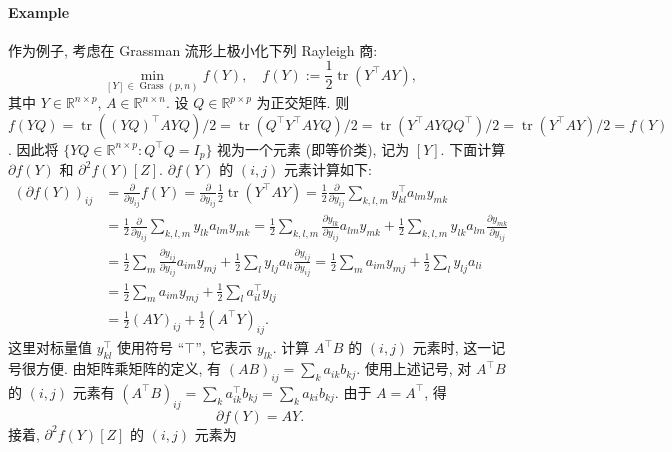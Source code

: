 \paragraph{Example}\label{ex:grassmann-rayleigh}
{作为例子, 考虑在 Grassman 流形上极小化下列 Rayleigh 商:}
\[\min_{[Y]\in\operatorname{Grass}(p,n)}f(Y),\quad f(Y):=\frac12\operatorname{tr}(Y^{\top}AY),\]
{其中 $Y\in\mathbb{R}^{n\times p}$, $A\in\mathbb{R}^{n\times n}$. 设 $Q\in\mathbb{R}^{p\times p}$ 为正交矩阵. 则 $f(YQ)=\operatorname{tr}((YQ)^{\top}AYQ)/2=\operatorname{tr}(Q^{\top}Y^{\top}AYQ)/2=\operatorname{tr}(Y^{\top}AYQQ^{\top})/2=\operatorname{tr}(Y^{\top}AY)/2=f(Y)$. 因此将 $\{YQ\in\mathbb{R}^{n\times p}:Q^{\top}Q=I_p\}$ 视为一个元素 (即等价类), 记为 $[Y]$. 下面计算 $\partial f(Y)$ 和 $\partial^2f(Y)[Z]$.}
{$\partial f(Y)$ 的 $(i,j)$ 元素计算如下:}
\[\begin{aligned}
(\partial f(Y))_{ij}&=\frac{\partial}{\partial y_{ij}}f(Y)=\frac{\partial}{\partial y_{ij}}\frac12\operatorname{tr}(Y^{\top}AY)=\frac12\frac{\partial}{\partial y_{ij}}\sum_{k,l,m}y_{kl}^{\top}a_{lm}y_{mk}\\
&=\frac12\frac{\partial}{\partial y_{ij}}\sum_{k,l,m}y_{lk}a_{lm}y_{mk}
=\frac12\sum_{k,l,m}\frac{\partial y_{lk}}{\partial y_{ij}}a_{lm}y_{mk}+\frac12\sum_{k,l,m}y_{lk}a_{lm}\frac{\partial y_{mk}}{\partial y_{ij}}\\
&=\frac12\sum_m\frac{\partial y_{ij}}{\partial y_{ij}}a_{im}y_{mj}+\frac12\sum_ly_{lj}a_{li}\frac{\partial y_{ij}}{\partial y_{ij}}
=\frac12\sum_ma_{im}y_{mj}+\frac12\sum_ly_{lj}a_{li}\\
&=\frac12\sum_ma_{im}y_{mj}+\frac12\sum_la_{il}^{\top}y_{lj}\\
&=\frac12(AY)_{ij}+\frac12(A^{\top}Y)_{ij}.
\end{aligned}\]
{这里对标量值 $y_{kl}^{\top}$ 使用符号 ``$\top$'', 它表示 $y_{lk}$. 计算 $A^{\top}B$ 的 $(i,j)$ 元素时, 这一记号很方便. 由矩阵乘矩阵的定义, 有 $(AB)_{ij}=\sum_ka_{ik}b_{kj}$. 使用上述记号, 对 $A^{\top}B$ 的 $(i,j)$ 元素有 $(A^{\top}B)_{ij}=\sum_ka_{ik}^{\top}b_{kj}=\sum_ka_{ki}b_{kj}$. 由于 $A=A^{\top}$, 得}
\begin{equation}\label{eq:rayleigh-gradient}
\partial f(Y)=AY.
\end{equation}
{接着, $\partial^2f(Y)[Z]$ 的 $(i,j)$ 元素为}

